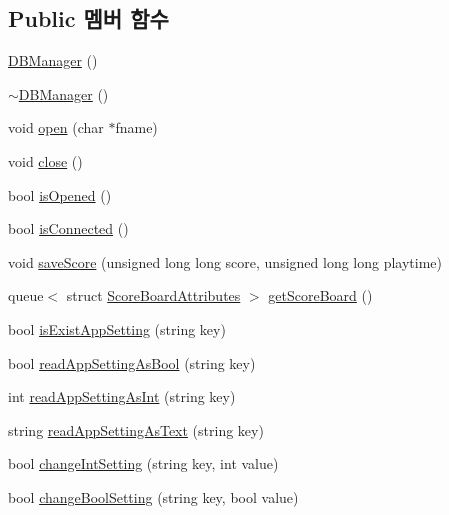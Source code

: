 \subsection*{Public 멤버 함수}
\begin{DoxyCompactItemize}
\item 
\hyperlink{class_tetris_1_1_d_b_management_1_1_d_b_manager_a8271c37f255a2e2bc85a3e1896a32c43}{D\+B\+Manager} ()
\item 
\hyperlink{class_tetris_1_1_d_b_management_1_1_d_b_manager_ac22f39981d5c862ad17b7420e313f1b2}{$\sim$\+D\+B\+Manager} ()
\item 
void \hyperlink{class_tetris_1_1_d_b_management_1_1_d_b_manager_a8bf7e756a9cca7e57fef00076fb62f36}{open} (char $\ast$fname)
\item 
void \hyperlink{class_tetris_1_1_d_b_management_1_1_d_b_manager_a8390e6ddf3fa06e90fa5c2ab4997e5c1}{close} ()
\item 
bool \hyperlink{class_tetris_1_1_d_b_management_1_1_d_b_manager_a16460066d64c9183a63194177bb0458e}{is\+Opened} ()
\item 
bool \hyperlink{class_tetris_1_1_d_b_management_1_1_d_b_manager_a62043d50855f42b69b057527b14dec0f}{is\+Connected} ()
\item 
void \hyperlink{class_tetris_1_1_d_b_management_1_1_d_b_manager_aef16da1d2e564caa309bfc3b3e419d7e}{save\+Score} (unsigned long long score, unsigned long long playtime)
\item 
queue$<$ struct \hyperlink{struct_tetris_1_1_d_b_management_1_1_score_board_attributes}{Score\+Board\+Attributes} $>$ \hyperlink{class_tetris_1_1_d_b_management_1_1_d_b_manager_aa67ef286408b2631e15e9f8f41937c97}{get\+Score\+Board} ()
\item 
bool \hyperlink{class_tetris_1_1_d_b_management_1_1_d_b_manager_aa80722572c33389c1c73f88de9f199b6}{is\+Exist\+App\+Setting} (string key)
\item 
bool \hyperlink{class_tetris_1_1_d_b_management_1_1_d_b_manager_a598b8014fcad434b5b1162cc6767d22c}{read\+App\+Setting\+As\+Bool} (string key)
\item 
int \hyperlink{class_tetris_1_1_d_b_management_1_1_d_b_manager_ac52daf6ea2310b848278454c30698436}{read\+App\+Setting\+As\+Int} (string key)
\item 
string \hyperlink{class_tetris_1_1_d_b_management_1_1_d_b_manager_acb213c517f06d1eadafd45a86b91c2ff}{read\+App\+Setting\+As\+Text} (string key)
\item 
bool \hyperlink{class_tetris_1_1_d_b_management_1_1_d_b_manager_aead8bb3f2a64fdf6ac59c69bfd21a01e}{change\+Int\+Setting} (string key, int value)
\item 
bool \hyperlink{class_tetris_1_1_d_b_management_1_1_d_b_manager_aece3390d5f2edca3f86316b903870c92}{change\+Bool\+Setting} (string key, bool value)
\end{DoxyCompactItemize}
